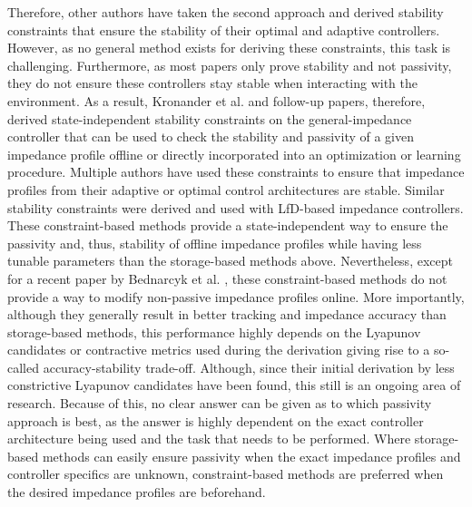 Therefore, other authors have taken the second approach and derived stability constraints that ensure the stability of their optimal and adaptive controllers. However, as no general method exists for deriving these constraints, this task is challenging. Furthermore, as most papers only prove stability and not passivity, they do not ensure these controllers stay stable when interacting with the environment. As a result, Kronander et al. \cite{kronanderStabilityConsiderationsVariable2016} and follow-up papers, therefore, derived state-independent stability constraints on the general-impedance controller that can be used to check the stability and passivity of a given impedance profile offline or directly incorporated into an optimization or learning procedure. Multiple authors have used these constraints to ensure that impedance profiles from their adaptive or optimal control architectures are stable. Similar stability constraints were derived and used with LfD-based impedance controllers. These constraint-based methods provide a state-independent way to ensure the passivity and, thus, stability of offline impedance profiles while having less tunable parameters than the storage-based methods above. Nevertheless, except for a recent paper by Bednarcyk et al. \cite {bednarczykPassivityFilterVariable2020}, these constraint-based methods do not provide a way to modify non-passive impedance profiles online. More importantly, although they generally result in better tracking and impedance accuracy than storage-based methods, this performance highly depends on the Lyapunov candidates or contractive metrics used during the derivation giving rise to a so-called accuracy-stability trade-off. Although, since their initial derivation by \cite{kronanderStabilityConsiderationsVariable2016} less constrictive Lyapunov candidates have been found, this still is an ongoing area of research. Because of this, no clear answer can be given as to which passivity approach is best, as the answer is highly dependent on the exact controller architecture being used and the task that needs to be performed. Where storage-based methods can easily ensure passivity when the exact impedance profiles and controller specifics are unknown, constraint-based methods are preferred when the desired impedance profiles are beforehand.

